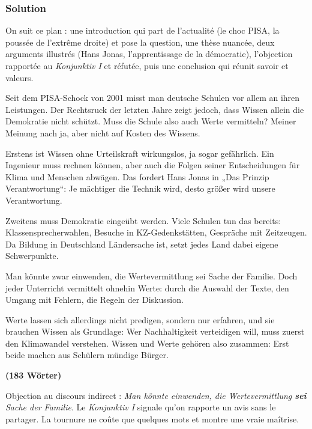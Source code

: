 \documentclass[11pt,a4paper]{article}
\begin{document}
\hypertarget{solution-1}{%
\subsubsection{Solution}\label{solution-1}}

On suit ce plan : une introduction qui part de l'actualité (le choc PISA, la poussée de l'extrême droite) et pose la question, une thèse nuancée, deux arguments illustrés (Hans Jonas, l'apprentissage de la démocratie), l'objection rapportée au \emph{Konjunktiv I} et réfutée, puis une conclusion qui réunit savoir et valeurs.

Seit dem PISA-Schock von 2001 misst man deutsche Schulen vor allem an ihren Leistungen. Der Rechtsruck der letzten Jahre zeigt jedoch, dass Wissen allein die Demokratie nicht schützt. Muss die Schule also auch Werte vermitteln? Meiner Meinung nach ja, aber nicht auf Kosten des Wissens.

Erstens ist Wissen ohne Urteilskraft wirkungslos, ja sogar gefährlich. Ein Ingenieur muss rechnen können, aber auch die Folgen seiner Entscheidungen für Klima und Menschen abwägen. Das fordert Hans Jonas in „Das Prinzip Verantwortung``: Je mächtiger die Technik wird, desto größer wird unsere Verantwortung.

Zweitens muss Demokratie eingeübt werden. Viele Schulen tun das bereits: Klassensprecherwahlen, Besuche in KZ-Gedenkstätten, Gespräche mit Zeitzeugen. Da Bildung in Deutschland Ländersache ist, setzt jedes Land dabei eigene Schwerpunkte.

Man könnte zwar einwenden, die Wertevermittlung sei Sache der Familie. Doch jeder Unterricht vermittelt ohnehin Werte: durch die Auswahl der Texte, den Umgang mit Fehlern, die Regeln der Diskussion.

Werte lassen sich allerdings nicht predigen, sondern nur erfahren, und sie brauchen Wissen als Grundlage: Wer Nachhaltigkeit verteidigen will, muss zuerst den Klimawandel verstehen. Wissen und Werte gehören also zusammen: Erst beide machen aus Schülern mündige Bürger.

\textbf{(183 Wörter)}

\begin{methode}

Objection au discours indirect : \emph{Man könnte einwenden, die Wertevermittlung \textbf{sei} Sache der Familie}. Le \emph{Konjunktiv I} signale qu'on rapporte un avis sans le partager. La tournure ne coûte que quelques mots et montre une vraie maîtrise.

\end{methode}
\end{document}
